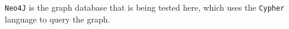\texttt{Neo4J} is the graph database that is being tested here, which uses the \texttt{Cypher} language to query the
graph.

%
%
%
%
%
%
%
%
%
%
%
